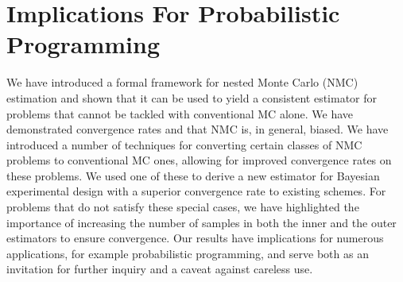 
\section{Implications For Probabilistic Programming}
\label{sec:design:imp}

We have introduced a formal framework for nested Monte Carlo (NMC) estimation and shown that
it can be used to yield a consistent estimator for problems that cannot be tackled
with conventional MC alone.  We have demonstrated convergence rates and that NMC
is, in general, biased. We have introduced a number of techniques for converting certain classes
of NMC problems to conventional MC ones, allowing for improved convergence rates on these problems.
We used one of these to derive a new estimator for Bayesian experimental design
with a superior convergence rate to existing schemes.  For problems that do not satisfy these special
cases, we have highlighted the importance of increasing the number of samples in both the inner
and the outer estimators to ensure convergence.  Our results have implications for numerous
applications, for example probabilistic programming, and serve both as an invitation for further inquiry 
and a caveat against careless use.



